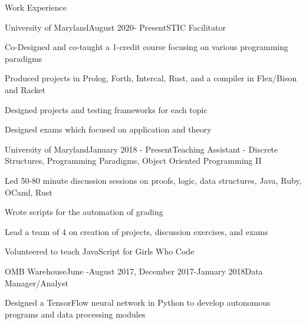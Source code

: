 \documentclass{resume} %
\begin{document}
\begin{rSection}{Work Experience}

\begin{rSubsection}{University of Maryland}{August 2020- Present}{STIC Facilitator}{}
\item Co-Designed and co-taught a 1-credit course focusing on various programming paradigms
\item Produced projects in Prolog, Forth, Intercal, Rust, and a compiler in Flex/Bison and Racket
\item Designed projects and testing frameworks for each topic
\item Designed exams which focused on application and theory
\end{rSubsection}

\begin{rSubsection}{University of Maryland}{January 2018 - Present}{Teaching Assistant - Discrete Structures, Programming Paradigms, Object Oriented Programming II}{}
\item Led 50-80 minute discussion sessions on proofs, logic, data structures, Java, Ruby, OCaml, Rust
\item Wrote scripts for the automation of grading
\item Lead a team of 4 on creation of projects, discussion exercises, and exams 
\item Volunteered to teach JavaScript for Girls Who Code
\end{rSubsection}


\begin{rSubsection}{OMB Warehouse}{June -August 2017, December 2017-January 2018}{Data Manager/Analyst}{}
\item Designed a TensorFlow neural network in Python to develop autonomous programs and data processing modules
\end{rSubsection}

\end{rSection}

\end{document}
